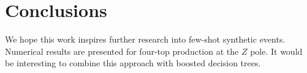 \section{Conclusions}\label{sec:conclusions}

We hope this work inspires further research into few-shot synthetic
events. Numerical results are presented for four-top production at the
$Z$ pole. It would be interesting to combine this approach with boosted
decision trees.

